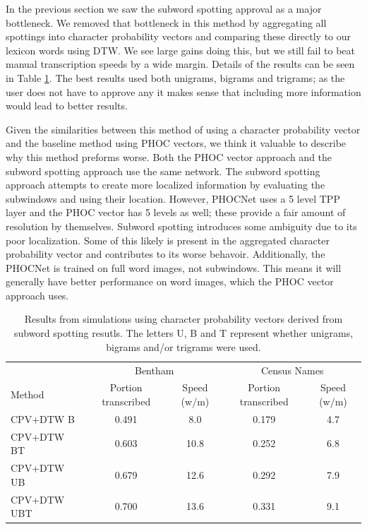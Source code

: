 \documentclass[ms,electronic,twosidetoc,letterpaper,chaptercenter,parttop,lol,lof,lot]{byumsphd}
\begin{document}
In the previous section we saw the subword spotting approval as a major bottleneck. We removed that bottleneck in this method by aggregating all spottings into character probability vectors and comparing these directly to our lexicon words using DTW. We see large gains doing this, but we still fail to beat manual transcription speeds by a wide margin. Details of the results can be seen in Table \ref{tab:dtwresults}. The best results used both unigrams, bigrams and trigrams; as the user does not have to approve any it makes sense that including more information would lead to better results.

Given the similarities between this method of using a character probability vector and the baseline method using PHOC vectors, we think it valuable to describe why this method preforms worse.
Both the PHOC vector approach and the subword spotting approach use the same network. The subword spotting approach attempts to create more localized information by evaluating the subwindows and using their location. However, PHOCNet uses a 5 level TPP layer and the PHOC vector has 5 levels as well; these provide a fair amount of resolution by themselves. Subword spotting introduces some ambiguity due to its poor localization. Some of this likely is present in the aggregated character probability vector and contributes to its worse behavoir. Additionally, the PHOCNet is trained on full word images, not subwindows. This means it will generally have better performance on word images, which the PHOC vector approach uses.


\begin{table}
\centering
\begin{tabular}{| l | c  c | c c |}
  \hline
   & \multicolumn{2}{c|}{Bentham} & \multicolumn{2}{c|}{Census Names}\\
  Method & Portion transcribed & Speed (w/m) & Portion transcribed & Speed (w/m)\\
  \hline
  CPV+DTW B & 0.491 & 8.0 & 0.179 & 4.7 \\
  CPV+DTW BT & 0.603 & 10.8 & 0.252 & 6.8 \\
  CPV+DTW UB & 0.679 & 12.6 & 0.292 & 7.9 \\
  CPV+DTW UBT & 0.700 & 13.6 & 0.331 & 9.1 \\
  \hline  
\end{tabular}
\caption{Results from simulations using character probability vectors derived from subword spotting resutls. The letters U, B and T represent whether unigrams, bigrams and/or trigrams were used.}
\label{tab:dtwresults}
\end{table}
\end{document}
